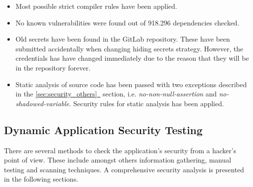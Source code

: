 \documentclass{article} %
\newcommand{\fullref}[1]{\hyperref[#1]{\ref*{#1}\ \nameref*{#1}}}
\begin{document}
\begin{itemize}
    \item Most possible strict compiler rules have been applied.
    \item No known vulnerabilities were found out of 918.296 dependencies checked.
    \item Old secrets have been found in the GitLab repository. These have been submitted accidentally when changing hiding secrets strategy. However, the credentials has have changed immediately due to the reason that they will be in the repository forever.
    \item Static analysis of source code has been passed with two exceptions described in the \fullref{sec:security_others} section, i.e. \textit{no-non-null-assertion} and \textit{no-shadowed-variable}. Security rules for static analysis has been applied.
\end{itemize}
\subsection{Dynamic Application Security Testing}
There are several methods to check the application's security from a hacker's point of view. These include amongst others information gathering, manual testing and scanning techniques. A comprehensive security analysis is presented in the following sections.
\end{document}
